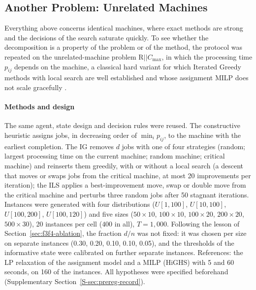 \documentclass[final,3p,times,11pt,authoryear]{elsarticle}
\begin{document}


\subsection{Another Problem: Unrelated Machines}
\label{sec:unrelated}

Everything above concerns identical machines, where exact methods are strong
and the decisions of the search saturate quickly. To see whether the
decomposition is a property of the problem or of the method, the protocol was
repeated on the unrelated-machine problem $\mathrm{R}||C_{\max}$, in which the
processing time $p_{ij}$ depends on the machine, a classical hard variant for
which Iterated Greedy methods with local search are well established
\citep{FanjulPeyroRuiz2010} and whose assignment MILP does not scale gracefully
\citep[LP rounding gives a $2$-approximation;][]{LenstraEtal1990}.

\paragraph{Methods and design}
The same agent, state design and decision rules were reused. The constructive
heuristic assigns jobs, in decreasing order of $\min_i p_{ij}$, to the machine
with the earliest completion. The IG removes $d$ jobs with one of four
strategies (random; largest processing time on the current machine; random
machine; critical machine) and reinserts them greedily, with or without a
local search (a descent that moves or swaps jobs from the critical machine,
at most 20 improvements per iteration); the ILS applies a best-improvement move,
swap or double move from the critical machine and perturbs three random jobs
after 50 stagnant iterations. Instances were generated with four distributions
($U[1,100]$, $U[10,100]$, $U[100,200]$, $U[100,120]$) and five sizes
($50\times10$, $100\times10$, $100\times20$, $200\times20$, $500\times30$), 20
instances per cell ($400$ in all), $T=1{,}000$. Following the lesson of
Section~\ref{sec:f3f4-ablation}, the fraction $d/n$ was not fixed: it was
chosen per size on separate instances (0.30, 0.20, 0.10, 0.10, 0.05), and the
thresholds of the informative state were calibrated on further separate
instances. References: the LP relaxation of the assignment model and a MILP
(HiGHS) with 5 and 60 seconds, on 160 of the instances. All hypotheses were
specified beforehand (Supplementary Section~\ref{S-sec:prereg-record}).
\end{document}
